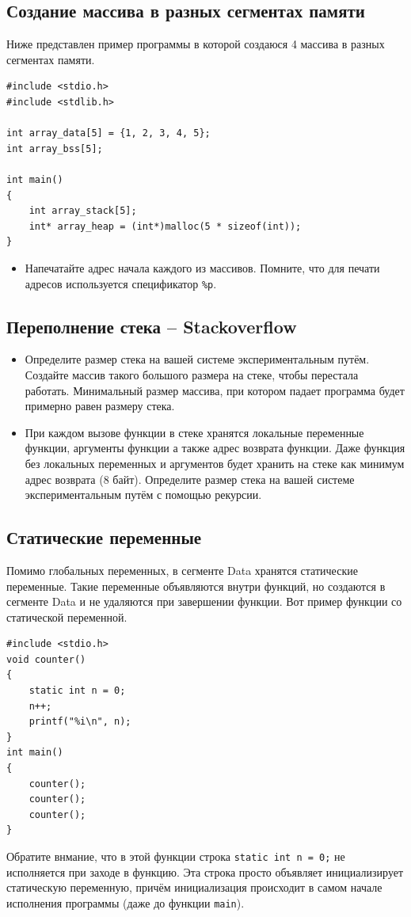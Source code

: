 \documentclass{article}
\begin{document}
\subsection*{Создание массива в разных сегментах памяти}
Ниже представлен пример программы в которой создаюся 4 массива в разных сегментах памяти.
\begin{lstlisting}
#include <stdio.h>
#include <stdlib.h>

int array_data[5] = {1, 2, 3, 4, 5};
int array_bss[5];

int main() 
{
    int array_stack[5];
    int* array_heap = (int*)malloc(5 * sizeof(int));
}
\end{lstlisting}
\begin{itemize}
\item Напечатайте адрес начала каждого из массивов. Помните, что для печати адресов используется спецификатор \texttt{\%p}.
\end{itemize}



\subsection*{Переполнение стека -- Stackoverflow}
\begin{itemize}
\item Определите размер стека на вашей системе экспериментальным путём. Создайте массив такого большого размера на стеке, чтобы перестала работать. Минимальный размер массива, при котором падает программа будет примерно равен размеру стека.
\item При каждом вызове функции в стеке хранятся локальные переменные функции, аргументы функции а также адрес возврата функции. Даже функция без локальных переменных и аргументов будет хранить на стеке как минимум адрес возврата (8 байт). Определите размер стека на вашей системе экспериментальным путём с помощью рекурсии.
\end{itemize}

\subsection*{Статические переменные}
Помимо глобальных переменных, в сегменте Data хранятся статические переменные. Такие переменные объявляются внутри функций, но создаются в сегменте Data и не удаляются при завершении функции. Вот пример функции со статической переменной.
\begin{lstlisting}
#include <stdio.h>
void counter() 
{
    static int n = 0;
    n++;
    printf("%i\n", n);
}
int main() 
{
    counter();
    counter();
    counter();
}
\end{lstlisting}
Обратите внмание, что в этой функции строка \texttt{static int n = 0;} не исполняется при заходе в функцию. Эта строка просто объявляет инициализирует статическую переменную, причём инициализация происходит в самом начале исполнения программы (даже до функции \texttt{main}). 
\end{document}

